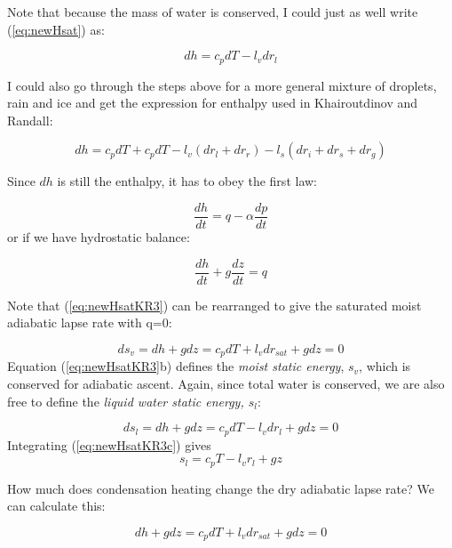 \documentclass[12pt]{article}
\begin{document}
Note that because the mass of water is conserved, I could just as well write (\ref{eq:newHsat}) as:

\begin{equation}
  \label{eq:newHsatb}
  dh = c_p dT  - l_v dr_l
\end{equation}


I could also go through the steps above for a more general  mixture of droplets, rain and ice
and get the expression for enthalpy used in Khairoutdinov and Randall:


\begin{equation}
  \label{eq:newHsatKR}
  dh = c_p dT + 
        c_p dT - l_v (dr_l + dr_r) - l_s (dr_i + dr_s + dr_g)
\end{equation}

Since $dh$ is still the enthalpy, it has to obey the first law:

\begin{equation}
  \label{eq:newHsatKR2}
  \frac{dh}{dt} = q - \alpha \frac{dp}{dt} 
\end{equation}
or if we have hydrostatic balance:

\begin{equation}
  \label{eq:newHsatKR3}
  \frac{dh}{dt} + g\frac{dz}{dt}  = q
\end{equation}

Note that (\ref{eq:newHsatKR3}) can be rearranged to give the saturated moist adiabatic lapse rate
with q=0:

\begin{equation}
  \label{eq:newHsatKR3b}
ds_v =  dh + g dz   = c_p dT + l_v d r_{sat} + g dz = 0
\end{equation}
Equation (\ref{eq:newHsatKR3}b) defines the \textit{moist static energy}, $s_v$,
which is conserved for adiabatic ascent.  Again, since total water is conserved,
we are also free to define the \textit{liquid water static energy, $s_l$}:

\begin{equation}
  \label{eq:newHsatKR3c}
ds_l =  dh + g dz   = c_p dT - l_v d r_l + g dz = 0
\end{equation}
Integrating (\ref{eq:newHsatKR3c}) gives
\begin{equation}
  \label{eq:newHsatKR3d}
s_l = c_p T - l_v r_l + g z
\end{equation}

How much does condensation heating change the dry adiabatic lapse rate?
We can calculate this:

\begin{equation}
  \label{eq:newHsatKR4}
  dh + g dz  = c_p dT + l_v d r_{sat} + g dz = 0
\end{equation}
\end{document}
